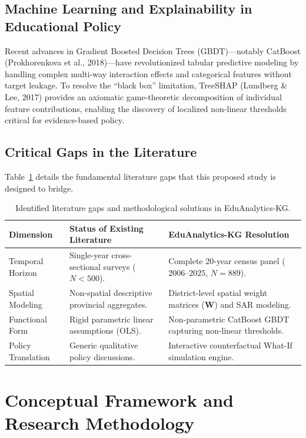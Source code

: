 \documentclass[12pt,letterpaper]{report}
\begin{document}
\section{Machine Learning and Explainability in Educational Policy}
Recent advances in Gradient Boosted Decision Trees (GBDT)—notably CatBoost (Prokhorenkova et al., 2018)—have revolutionized tabular predictive modeling by handling complex multi-way interaction effects and categorical features without target leakage. To resolve the ``black box'' limitation, TreeSHAP (Lundberg \& Lee, 2017) provides an axiomatic game-theoretic decomposition of individual feature contributions, enabling the discovery of localized non-linear thresholds critical for evidence-based policy.

\section{Critical Gaps in the Literature}
Table~\ref{tab:gaps} details the fundamental literature gaps that this proposed study is designed to bridge.

\begin{table}[htbp]
\centering
\begin{singlespace}
\small
\caption{Identified literature gaps and methodological solutions in EduAnalytics-KG.}
\label{tab:gaps}
\begin{tabularx}{\textwidth}{l p{4.5cm} X}
\toprule
\textbf{Dimension} & \textbf{Status of Existing Literature} & \textbf{EduAnalytics-KG Resolution} \\
\midrule
Temporal Horizon & Single-year cross-sectional surveys ($N < 500$). & Complete 20-year census panel ($2006\text{--}2025$, $N=889$). \\
Spatial Modeling & Non-spatial descriptive provincial aggregates. & District-level spatial weight matrices ($\mathbf{W}$) and SAR modeling. \\
Functional Form & Rigid parametric linear assumptions (OLS). & Non-parametric CatBoost GBDT capturing non-linear thresholds. \\
Policy Translation & Generic qualitative policy discussions. & Interactive counterfactual What-If simulation engine. \\
\bottomrule
\end{tabularx}
\end{singlespace}
\end{table}


\chapter{Conceptual Framework and Research Methodology}
\label{chap:methodology}
\end{document}
